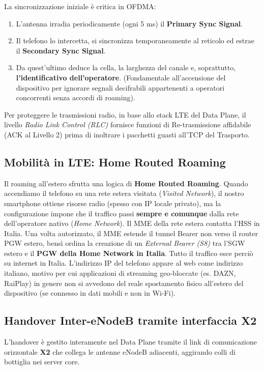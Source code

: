 La sincronizzazione iniziale è critica in OFDMA:
\begin{enumerate}
    \item L'antenna irradia periodicamente (ogni 5 ms) il \textbf{Primary Sync Signal}.
    \item Il telefono lo intercetta, si sincronizza temporaneamente al reticolo ed estrae il \textbf{Secondary Sync Signal}.
    \item Da quest'ultimo deduce la cella, la larghezza del canale e, soprattutto, \textbf{l'identificativo dell'operatore}. (Fondamentale all'accensione del dispositivo per ignorare segnali decifrabili appartenenti a operatori concorrenti senza accordi di roaming).
\end{enumerate}
Per proteggere le trasmissioni radio, in base allo stack LTE del Data Plane, il livello \textit{Radio Link Control (RLC)} fornisce funzioni di Re-trasmissione affidabile (ACK al Livello 2) prima di inoltrare i pacchetti guasti all'TCP del Trasporto.

\subsection{Mobilità in LTE: Home Routed Roaming}
Il roaming all'estero sfrutta una logica di \textbf{Home Routed Roaming}.
Quando accendiamo il telefono su una rete estera visitata (\textit{Visited Network}), il nostro smartphone ottiene risorse radio (spesso con IP locale privato), ma la configurazione impone che il traffico passi \textbf{sempre e comunque} dalla rete dell'operatore nativo (\textit{Home Network}).
Il MME della rete estera contatta l'HSS in Italia. Una volta autorizzato, il MME estende il tunnel Bearer non verso il router PGW estero, bensì ordina la creazione di un \textit{External Bearer (S8)} tra l'SGW estero e il \textbf{PGW della Home Network in Italia}.
Tutto il traffico esce perciò su internet in Italia. L'indirizzo IP del telefono appare al web come indirizzo italiano, motivo per cui applicazioni di streaming geo-bloccate (es. DAZN, RaiPlay) in genere non si avvedono del reale spostamento fisico all'estero del dispositivo (se connesso in dati mobili e non in Wi-Fi).

\subsection{Handover Inter-eNodeB tramite interfaccia X2}
L'handover è gestito interamente nel Data Plane tramite il link di comunicazione orizzontale \textbf{X2} che collega le antenne eNodeB adiacenti, aggirando colli di bottiglia nei server core.


